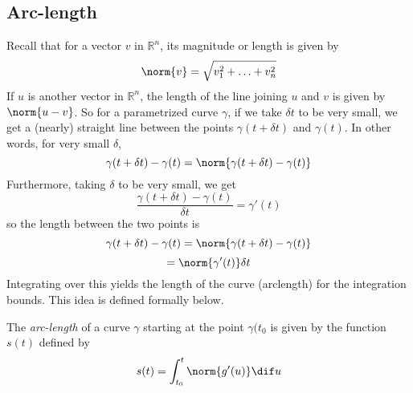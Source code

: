 \subsection{Arc-length}
    Recall that for a vector \(v\) in \(\mathbb{R}^{n}\), its magnitude or length is given by
    \[
\norm{v} = \sqrt{v_{1}^{2} + \ldots + v_{n}^{2}}
\]
    If \(u\) is another vector in \(\mathbb{R}^{n}\), the length of the line joining \(u\) and
    \(v\) is given by \(\norm{u-v}\). So for a parametrized curve \(\gamma\), if we take \(
    \delta t\) to be very small, we get a (nearly) straight line between the points \(\gamma
    (t + \delta t)\) and \(\gamma(t)\). In other words, for very small \(\delta\),
        \[
\gamma(t + \delta t) - \gamma(t) = \norm{\gamma(t + \delta t) - \gamma(t)}
\]
    Furthermore, taking \(\delta\) to be very small, we get
        \[
\frac{\gamma(t + \delta t) - \gamma(t)}{\delta t} = \gamma'(t)
\]
    so the length between the two points is
        \[
\gamma(t + \delta t) - \gamma(t) = \norm{\gamma(t + \delta t) - \gamma(t)}
\]
        \[
= \norm{\gamma'(t)}\delta t
\]
    Integrating over this yields the length of the curve (arclength) for the integration bounds. This idea is defined formally below.

    \begin{definition}
        The \textit{arc-length} of a curve \(\gamma\) starting at the point \(\gamma(t_{0} \) is given by the function \(s(t) \) defined by
        \[
s(t) = \int_{t_{0}}^{t} \norm{g'(u)} \dif u
\]
    \end{definition}

